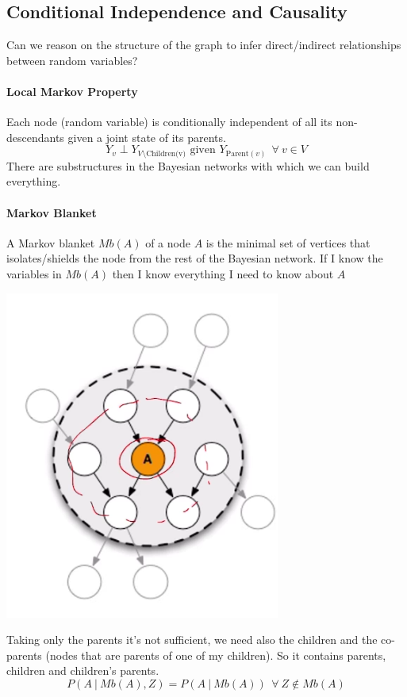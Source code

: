 \documentclass[10pt]{report}
\begin{document}
\subsection{Conditional Independence and Causality}
Can we reason on the structure of the graph to infer direct/indirect relationships between random variables?
\paragraph{Local Markov Property} Each node (random variable) is conditionally independent of all its non-descendants given a joint state of its parents. $$Y_v\perp Y_{V\setminus \text{Children(v)}}\text{ given }Y_{\text{Parent}(v)}\:\:\forall\:v\in V$$
There are substructures in the Bayesian networks with which we can build everything.
\paragraph{Markov Blanket} A Markov blanket $Mb(A)$ of a node $A$ is the minimal set of vertices that isolates/shields the node from the rest of the Bayesian network. If I know the variables in $Mb(A)$ then I know everything I need to know about $A$\begin{center}
	\includegraphics[scale=0.5]{19.png}
\end{center}
Taking only the parents it's not sufficient, we need also the children and the co-parents (nodes that are parents of one of my children). So it contains parents, children and children's parents.
$$P(A\:|\:Mb(A), Z) = P(A\:|\:Mb(A))\:\:\forall\:Z\not\in Mb(A)$$
\end{document}
